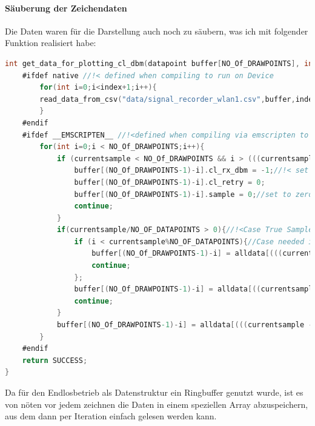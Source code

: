 \paragraph*{Säuberung der Zeichendaten}
Die Daten waren für die Darstellung auch noch zu säubern, was ich mit folgender Funktion realisiert habe:
\begin{lstlisting}[caption={Codeausschnitt - Säuberung des Arrays mit den Datenpunkten die für einen Frame gezeichnet werden},captionpos=b,language=C,breaklines]
int get_data_for_plotting_cl_dbm(datapoint buffer[NO_Of_DRAWPOINTS], int index){ //function to wrap data generation for plotting cl_db 
    #ifdef native //!< defined when compiling to run on Device
        for(int i=0;i<index+1;i++){
        read_data_from_csv("data/signal_recorder_wlan1.csv",buffer,index); //!< Read in the Data up until specified point
        }
    #endif
    #ifdef __EMSCRIPTEN__ //!<defined when compiling via emscripten to wasm, used in Browser
        for(int i=0;i < NO_Of_DRAWPOINTS;i++){          
            if (currentsample < NO_Of_DRAWPOINTS && i > (((currentsample - 1) % NO_OF_DATAPOINTS))){ //Case needed because garbage data is read before the array of datapoints actually begins.
                buffer[(NO_Of_DRAWPOINTS-1)-i].cl_rx_dbm = -1;//!< set to invalid value so nothing gets drawn
                buffer[(NO_Of_DRAWPOINTS-1)-i].cl_retry = 0;
                buffer[(NO_Of_DRAWPOINTS-1)-i].sample = 0;//set to zero so nothing gets drawn
                continue;
            }
            if(currentsample/NO_OF_DATAPOINTS > 0){//!<Case True Samplenumber>NO_OF_DATAPOINTS, prevent overflow of Dataarray
                if (i < currentsample%NO_OF_DATAPOINTS){//Case needed if some of the data is at then end of the Dataarray and some at the start because of Ringbuffer.
                    buffer[(NO_Of_DRAWPOINTS-1)-i] = alldata[(((currentsample-1) % NO_OF_DATAPOINTS))-i]; //
                    continue;
                };
                buffer[(NO_Of_DRAWPOINTS-1)-i] = alldata[((currentsample % NO_OF_DATAPOINTS)-i)+(NO_OF_DATAPOINTS-1)]; //
                continue;
            }            
            buffer[(NO_Of_DRAWPOINTS-1)-i] = alldata[(((currentsample - 1)% NO_OF_DATAPOINTS))-i]; //!< if no overflow at ring buffer just copy normaly
        }
    #endif
    return SUCCESS;
} 
\end{lstlisting}
Da für den Endlosbetrieb als Datenstruktur ein Ringbuffer genutzt wurde, ist es von nöten vor jedem zeichnen die Daten in einem speziellen Array abzuspeichern, aus dem dann per Iteration einfach gelesen werden kann.
